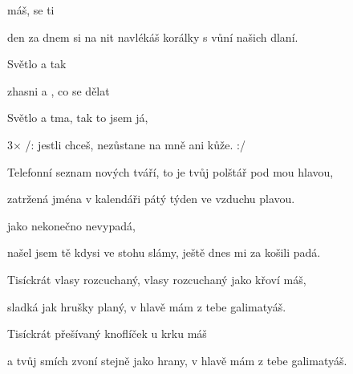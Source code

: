 

\zs
{}   máš,
  se ti 

den za dnem si na nit navlékáš korálky s vůní našich dlaní.
\ks

\zr
Světlo a  tak   

zhasni a , co se dělat 

Světlo a tma, tak to jsem já,

3× /: jestli chceš, nezůstane na mně ani kůže. :/
\kr

\zs
Telefonní seznam nových tváří,
to je tvůj polštář pod mou hlavou,

zatržená jména v kalendáři
pátý týden ve vzduchu plavou.
\ks

\zr  \kr

\zs
{}  
jako nekonečno nevypadá,

našel jsem tě kdysi ve stohu slámy,
ještě dnes mi za košili padá.
\ks

\zs
Tisíckrát vlasy rozcuchaný,
vlasy rozcuchaný jako křoví máš,

sladká jak hrušky planý,
v hlavě mám z tebe galimatyáš.
\ks

\zs
Tisíckrát přešívaný
knoflíček u krku máš

a tvůj smích zvoní stejně jako hrany,
v hlavě mám z tebe galimatyáš.
\ks

\kp
